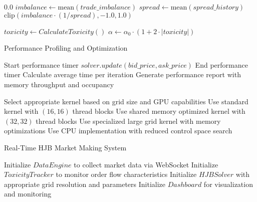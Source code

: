 \documentclass[twocolumn,11pt]{IEEEtran}  %
\begin{document}
\begin{onecolumn}
\begin{onecolumn}
\begin{algorithm}
\begin{algorithmic}[1]
        \State \Return $0.0$
    \EndIf
    \State $imbalance \gets \text{mean}(trade\_imbalance)$
    \State $spread \gets \text{mean}(spread\_history)$
    \State \Return $\text{clip}(imbalance \cdot (1/spread), -1.0, 1.0)$
\EndFunction

\State {}
\State $toxicity \gets CalculateToxicity()$
\State $\alpha \gets \alpha_0 \cdot (1 + 2 \cdot |toxicity|)$ 
\end{algorithmic}
\end{algorithm}


\begin{algorithm}
\caption{Performance Profiling and Optimization}
\begin{algorithmic}[1]
    \State Start performance timer
        \State $solver.update(bid\_price, ask\_price)$
    \EndFor
    \State End performance timer
    \State Calculate average time per iteration
    \State Generate performance report with memory throughput and occupancy
\EndFunction

\State {}
    \State Select appropriate kernel based on grid size and GPU capabilities
        \State Use standard kernel with $(16, 16)$ thread blocks
        \State Use shared memory optimized kernel with $(32, 32)$ thread blocks
    \Else
        \State Use specialized large grid kernel with memory optimizations
    \EndIf
\Else
    \State Use CPU implementation with reduced control space search
\EndIf
\end{algorithmic}
\end{algorithm}

\begin{algorithm}
\caption{Real-Time HJB Market Making System}
\begin{algorithmic}[1]
\State Initialize $DataEngine$ to collect market data via WebSocket
\State Initialize $ToxicityTracker$ to monitor order flow characteristics
\State Initialize $HJBSolver$ with appropriate grid resolution and parameters
\State Initialize $Dashboard$ for visualization and monitoring


\end{algorithmic}
\end{algorithm}
\end{onecolumn}
\end{onecolumn}
\end{document}
